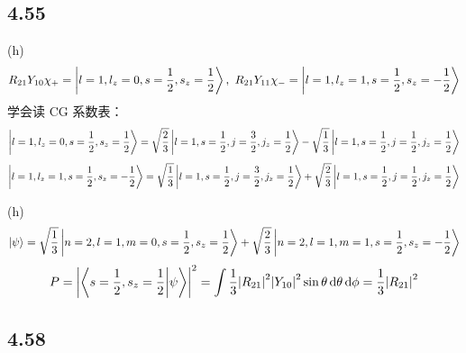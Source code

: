 \subsection{4.55}
\begin{framed}
    (h)
    \[
        R_{2 1} Y_{1 0} \chi_+ = \ket{l = 1, l_z = 0, s = \frac{1}{2}, s_z = \frac{1}{2}},\ R_{2 1} Y_{1 1} \chi_- = \ket{l = 1, l_z = 1, s = \frac{1}{2}, s_{z} = - \frac{1}{2}}
    \] 学会读 CG 系数表： \[
        \ket{l = 1, l_z = 0, s = \frac{1}{2}, s_z = \frac{1}{2}} = \sqrt{\frac{2}{3}} \ket{l = 1, s = \frac{1}{2}, j = \frac{3}{2}, j_z = \frac{1}{2}} - \sqrt{\frac{1}{3}} \ket{l = 1, s = \frac{1}{2}, j = \frac{1}{2}, j_z = \frac{1}{2}}
    \] \[
        \ket{l = 1, l_z = 1, s = \frac{1}{2}, s_z = - \frac{1}{2}} = \sqrt{\frac{1}{3}} \ket{l = 1, s = \frac{1}{2}, j = \frac{3}{2}, j_z = \frac{1}{2}} + \sqrt{\frac{2}{3}} \ket{l = 1, s = \frac{1}{2}, j = \frac{1}{2}, j_z = \frac{1}{2}}
    \]

    (h)
    \[
        \ket{\psi} = \sqrt{\frac{1}{3}} \ket{n = 2, l = 1, m = 0, s = \frac{1}{2}, s_z = \frac{1}{2}} + \sqrt{\frac{2}{3}} \ket{n = 2, l = 1, m = 1, s = \frac{1}{2}, s_z = - \frac{1}{2}}
    \] \[
        P = \qty|\braket{s = \frac{1}{2}, s_z = \frac{1}{2}}{\psi}|^2 = \int \frac{1}{3} \qty|R_{21}|^2 \qty|Y_{10}|^2 \sin \theta \dd{\theta} \dd{\phi} = \frac{1}{3} \qty|R_{21}|^2
    \]
\end{framed}

\subsection{4.58}
\begin{framed}

\end{framed}